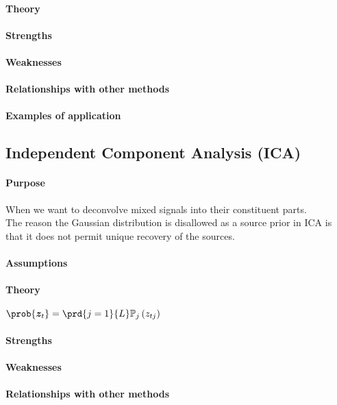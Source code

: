 \paragraph{Theory}
\paragraph{Strengths}
\paragraph{Weaknesses}
\paragraph{Relationships with other methods}
\paragraph{Examples of application}

\subsection{Independent Component Analysis (ICA)}
\paragraph{Purpose}
When we want to deconvolve mixed signals into their constituent parts.\\
The reason the Gaussian distribution is disallowed as a source prior in ICA is that 
it does not permit unique recovery of the sources.

\paragraph{Assumptions}
\paragraph{Theory}
$\prob{\bm{z}_{t}} = \prd{j=1}{L}\mathbb{P}_{j}\left(z_{tj}\right)$
\paragraph{Strengths}
\paragraph{Weaknesses}
\paragraph{Relationships with other methods}
